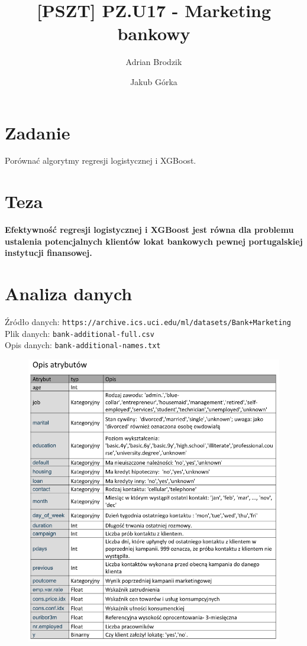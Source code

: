 \documentclass[12pt,a4paper]{article}
\begin{document}
\title{[PSZT] PZ.U17 - Marketing bankowy}
\author{Adrian Brodzik \and Jakub Górka}
\maketitle

\section*{Zadanie}
Porównać algorytmy regresji logistycznej i XGBoost.

\section*{Teza}
\textbf{Efektywność regresji logistycznej i XGBoost jest równa dla problemu ustalenia potencjalnych klientów lokat bankowych pewnej portugalskiej instytucji finansowej.}

\section*{Analiza danych}
Źródło danych: \texttt{https://archive.ics.uci.edu/ml/datasets/Bank+Marketing}
\\
Plik danych: \texttt{bank-additional-full.csv}
\\
Opis danych: \texttt{bank-additional-names.txt}

\begin{figure}[H]
	\centering
	\includegraphics[scale=0.65]{data_1.png}
\end{figure}
\end{document}
